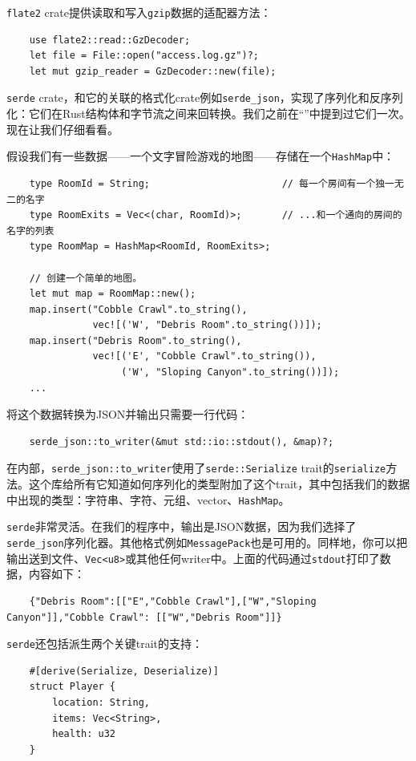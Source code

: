\texttt{flate2} crate提供读取和写入\texttt{gzip}数据的适配器方法：
\begin{verbatim}
    use flate2::read::GzDecoder;
    let file = File::open("access.log.gz")?;
    let mut gzip_reader = GzDecoder::new(file);
\end{verbatim}

\texttt{serde} crate，和它的关联的格式化crate例如\texttt{serde\_json}，实现了序列化和反序列化：它们在Rust结构体和字节流之间来回转换。我们之前在“”中提到过它们一次。现在让我们仔细看看。

假设我们有一些数据——一个文字冒险游戏的地图——存储在一个\texttt{HashMap}中：
\begin{verbatim}
    type RoomId = String;                       // 每一个房间有一个独一无二的名字
    type RoomExits = Vec<(char, RoomId)>;       // ...和一个通向的房间的名字的列表
    type RoomMap = HashMap<RoomId, RoomExits>;

    // 创建一个简单的地图。
    let mut map = RoomMap::new();
    map.insert("Cobble Crawl".to_string(),
               vec![('W', "Debris Room".to_string())]);
    map.insert("Debris Room".to_string(),
               vec![('E', "Cobble Crawl".to_string()),
                    ('W', "Sloping Canyon".to_string())]);
    ...
\end{verbatim}

将这个数据转换为JSON并输出只需要一行代码：
\begin{verbatim}
    serde_json::to_writer(&mut std::io::stdout(), &map)?;
\end{verbatim}

在内部，\texttt{serde\_json::to\_writer}使用了\texttt{serde::Serialize} trait的\texttt{serialize}方法。这个库给所有它知道如何序列化的类型附加了这个trait，其中包括我们的数据中出现的类型：字符串、字符、元组、vector、\texttt{HashMap}。

\texttt{serde}非常灵活。在我们的程序中，输出是JSON数据，因为我们选择了\texttt{serde\_json}序列化器。其他格式例如\texttt{MessagePack}也是可用的。同样地，你可以把输出送到文件、\texttt{Vec<u8>}或其他任何writer中。上面的代码通过\texttt{stdout}打印了数据，内容如下：
\begin{verbatim}
    {"Debris Room":[["E","Cobble Crawl"],["W","Sloping Canyon"]],"Cobble Crawl": [["W","Debris Room"]]}
\end{verbatim}

\texttt{serde}还包括派生两个关键trait的支持：
\begin{verbatim}
    #[derive(Serialize, Deserialize)]
    struct Player {
        location: String,
        items: Vec<String>,
        health: u32
    }
\end{verbatim}

